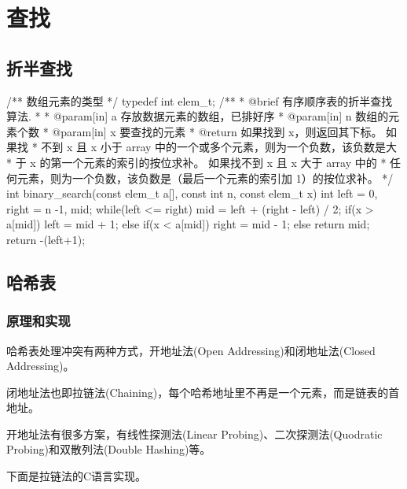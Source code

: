 \chapter{查找}

\section{折半查找} %

\begin{Codex}[label=binary_search.c]
/** 数组元素的类型 */
typedef int elem_t;
/**
  * @brief 有序顺序表的折半查找算法.
  *
  * @param[in] a 存放数据元素的数组，已排好序
  * @param[in] n 数组的元素个数
  * @param[in] x 要查找的元素
  * @return 如果找到 x，则返回其下标。 如果找
  * 不到 x 且 x 小于 array 中的一个或多个元素，则为一个负数，该负数是大
  * 于 x 的第一个元素的索引的按位求补。 如果找不到 x 且 x 大于 array 中的
  * 任何元素，则为一个负数，该负数是（最后一个元素的索引加 1）的按位求补。 
  */
int binary_search(const elem_t a[], const int n, const elem_t x) {
    int left = 0, right = n -1, mid;
    while(left <= right) {
        mid = left + (right - left) / 2;
        if(x > a[mid]) {
            left = mid + 1;
        } else if(x < a[mid]) {
            right = mid - 1;
        } else {
            return mid;
        }
    }
    return -(left+1);
}
\end{Codex}


\section{哈希表} %


\subsection{原理和实现}
\label{sec:hash-set}
哈希表处理冲突有两种方式，开地址法(Open Addressing)和闭地址法(Closed Addressing)。

闭地址法也即拉链法(Chaining)，每个哈希地址里不再是一个元素，而是链表的首地址。

开地址法有很多方案，有线性探测法(Linear Probing)、二次探测法(Quodratic Probing)和双散列法(Double Hashing)等。

下面是拉链法的C语言实现。

